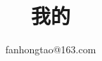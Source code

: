 \documentclass[UTF8]{ctexrep}
\begin{document}
\title{我的}
\author{fanhongtao@163.com}
\maketitle
\tableofcontents

\end{document}
